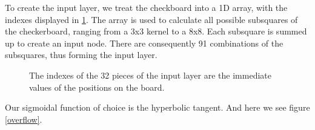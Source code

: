 \documentclass[12pt,a4paper]{article}
\newcommand{\bl}{\node [ball, ball color=black!80!white, draw=black!65!white, thin]{};}
\newcommand{\wh}{\node [ball, ball color=white] {};}
\begin{document}
To create the input layer, we treat the checkboard into a 1D array, with the indexes displayed in \ref{boardarray}. The array is used to calculate all possible subsquares of the checkerboard, ranging from a 3x3 kernel to a 8x8. Each subsquare is summed up to create an input node. There are consequently 91 combinations of the subsquares, thus forming the input layer. 

\begin{figure}[ht!]
    \centering
    

    \caption{The indexes of the 32 pieces of the input layer are the immediate values of the positions on the board. \label{boardarray}}
\end{figure}


Our sigmoidal function of choice is the hyperbolic tangent.  And here we see figure \ref{overflow}.
\end{document}
